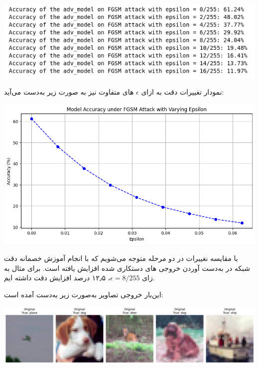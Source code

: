 \begin{qsolve}
	\begin{center}
		\includegraphics*[width=0.7\linewidth]{pics/img14.png}
		\label{تست نمونه ها با شبکه آموزش داده شده جدید به ازای epsilon های متفاوت}
	\end{center}
	
	نمودار تغییرات دقت به ازای $\epsilon$ های متفاوت نیز به صورت زیر به‌دست می‌آید:
	
	\begin{center}
		\includegraphics*[width=0.7\linewidth]{pics/img15.png}
		\label{نمودار تغییرات دقت شبکه به ازای epsilon های متفاوت}
	\end{center}
	
	
	با مقایسه نغییرات در دو مرحله متوجه می‌شویم که با انجام آموزش خصمانه دقت شبکه در به‌دست آوردن خروجی های دستکاری شده افزایش یافته است. برای مثال به زای $\epsilon=8/255$، 
	۱۲٫۵ درصد افزایش دقت داشته ایم.
	
	این‌بار خروجی تصاویر به‌صورت زیر به‌دست آمده است:
	
	\begin{center}
		\includegraphics*[width=0.8\linewidth]{pics/img16.png}
		\label{تصاویر اصلی}
	\end{center}
\end{qsolve}



